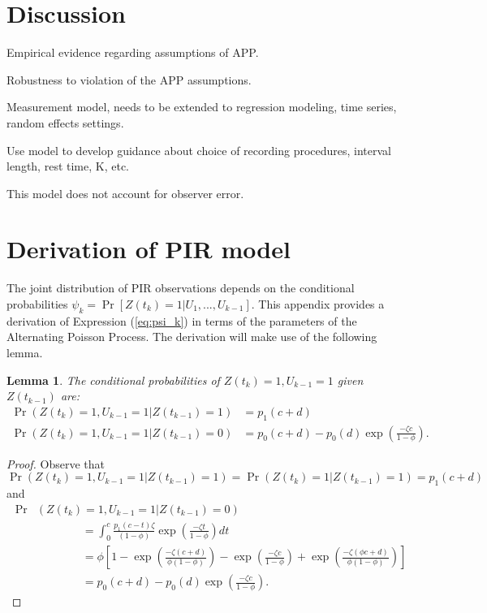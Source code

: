 \documentclass[man, noextraspace, floatsintext]{apa6}\usepackage[]{graphicx}\usepackage[]{color}
\newcommand{\bibfile}{Behavioral_observation-APP}
\newtheorem{lemma}{Lemma}
\begin{document}
\section{Discussion}
\label{sec:discussion}

Empirical evidence regarding assumptions of APP. 

Robustness to violation of the APP assumptions.

Measurement model, needs to be extended to regression modeling, time series, random effects settings.

Use model to develop guidance about choice of recording procedures, interval length, rest time, K, etc.

This model does not account for observer error.



 
\appendix

\section{Derivation of PIR model}
\label{app:PIR_derivation}

The joint distribution of PIR observations depends on the conditional probabilities $\psi_k = \Pr\left[ Z(t_k) = 1 \left| U_1,...,U_{k-1}\right.\right]$. 
This appendix provides a derivation of Expression (\ref{eq:psi_k}) in terms of the parameters of the Alternating Poisson Process. The derivation will make use of the following lemma.

\begin{lemma}
\label{lemma1}
The conditional probabilities of $Z(t_k) = 1, U_{k-1} = 1$ given $Z(t_{k-1})$ are:
\begin{align*}
\Pr\left(Z(t_k) = 1, U_{k-1} = 1 \left| Z(t_{k-1}) = 1 \right.\right) &= p_1(c + d) \\
\Pr\left(Z(t_k) = 1, U_{k-1} = 1 \left| Z(t_{k-1}) = 0 \right.\right) &= p_0(c + d) - p_0(d) \exp\left(\frac{- \zeta c}{1 - \phi}\right).
\end{align*}
\end{lemma}

\begin{proof}
Observe that \[
\Pr\left(Z(t_k) = 1, U_{k-1} = 1 \left| Z(t_{k-1}) = 1 \right.\right) = \Pr\left(Z(t_k) = 1 \left| Z(t_{k-1}) = 1 \right.\right) = p_1(c + d) \]
and \begin{align*}
\Pr &\left(Z(t_k) = 1, U_{k-1} = 1 \left| Z(t_{k-1}) = 0 \right.\right) \\
& \qquad \qquad = \int_0^c\frac{p_1(c - t) \zeta}{(1 - \phi)}\exp\left(\frac{-\zeta t}{1 - \phi}\right) dt \\
& \qquad \qquad  = \phi \left[ 1 - \exp\left(\frac{- \zeta (c + d)}{\phi(1 - \phi)}\right) - \exp\left(\frac{- \zeta c}{1 - \phi}\right) + \exp\left(\frac{- \zeta (\phi c + d)}{\phi(1 - \phi)}\right)\right] \\
& \qquad \qquad = p_0(c + d) - p_0(d) \exp\left(\frac{- \zeta c}{1 - \phi}\right).
\end{align*}
\end{proof}
\end{document}
